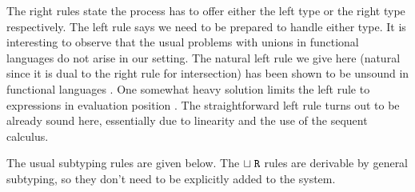 \documentclass[submission,copyright,creativecommons]{eptcs}
\renewcommand{\union}{\mathrel{\sqcup}}
\newcommand{\m}[1]{\mathsf{#1}}
\newcommand{\mb}[1]{\mbox{\bf #1}}
\newcommand{\semi}{\mathrel{;}}
\begin{document}
The right rules state the process has to offer either the left type or the right type respectively. The left rule says we need to be prepared to handle either type. It is interesting to observe that the usual problems with unions in functional languages do not arise in our setting. The natural left rule we give here (natural since it is dual to the right rule for intersection) has been shown to be unsound in functional languages \cite{Barbanera95ic}. One somewhat heavy solution limits the left rule to expressions in evaluation position \cite{DunfieldP04}. The straightforward left rule turns out to be already sound here, essentially due to linearity and the use of the sequent calculus.

The usual subtyping rules are given below. The $\union\Right$ rules are derivable by general subtyping, so they don't need to be explicitly added to the system.


\end{document}
